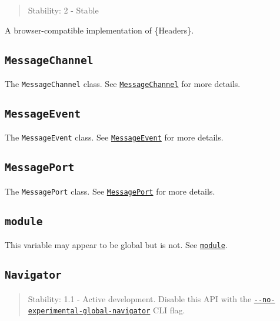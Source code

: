 \begin{quote}
Stability: 2 - Stable
\end{quote}

A browser-compatible implementation of \{Headers\}.

\subsection{\texorpdfstring{\texttt{MessageChannel}}{MessageChannel}}\label{messagechannel}

The \texttt{MessageChannel} class. See
\href{worker_threads.md\#class-messagechannel}{\texttt{MessageChannel}}
for more details.

\subsection{\texorpdfstring{\texttt{MessageEvent}}{MessageEvent}}\label{messageevent}

The \texttt{MessageEvent} class. See
\href{https://developer.mozilla.org/en-US/docs/Web/API/MessageEvent/MessageEvent}{\texttt{MessageEvent}}
for more details.

\subsection{\texorpdfstring{\texttt{MessagePort}}{MessagePort}}\label{messageport}

The \texttt{MessagePort} class. See
\href{worker_threads.md\#class-messageport}{\texttt{MessagePort}} for
more details.

\subsection{\texorpdfstring{\texttt{module}}{module}}\label{module}

This variable may appear to be global but is not. See
\href{modules.md\#module}{\texttt{module}}.

\subsection{\texorpdfstring{\texttt{Navigator}}{Navigator}}\label{navigator}

\begin{quote}
Stability: 1.1 - Active development. Disable this API with the
\href{cli.md\#--no-experimental-global-navigator}{\texttt{-\/-no-experimental-global-navigator}}
CLI flag.
\end{quote}


